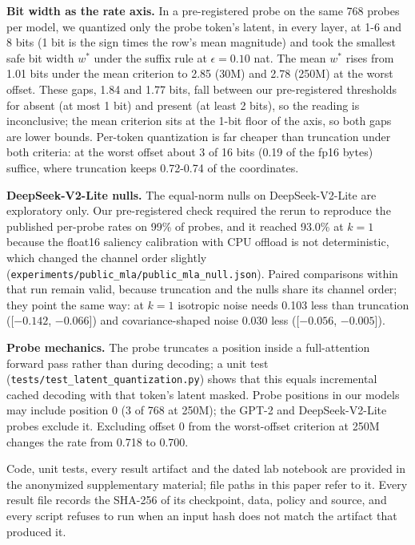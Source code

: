 \documentclass[10pt]{article}
\begin{document}
\textbf{Bit width as the rate axis.} In a pre-registered probe on the same 768 probes per model, we quantized only the probe token's latent, in every layer, at 1-6 and 8 bits (1 bit is the sign times the row's mean magnitude) and took the smallest safe bit width $w^*$ under the suffix rule at $\epsilon=0.10$ nat. The mean $w^*$ rises from 1.01 bits under the mean criterion to 2.85 (30M) and 2.78 (250M) at the worst offset. These gaps, 1.84 and 1.77 bits, fall between our pre-registered thresholds for absent (at most 1 bit) and present (at least 2 bits), so the reading is inconclusive; the mean criterion sits at the 1-bit floor of the axis, so both gaps are lower bounds. Per-token quantization is far cheaper than truncation under both criteria: at the worst offset about 3 of 16 bits (0.19 of the fp16 bytes) suffice, where truncation keeps 0.72-0.74 of the coordinates.

\textbf{DeepSeek-V2-Lite nulls.} The equal-norm nulls on DeepSeek-V2-Lite are exploratory only. Our pre-registered check required the rerun to reproduce the published per-probe rates on 99\% of probes, and it reached 93.0\% at $k=1$ because the float16 saliency calibration with CPU offload is not deterministic, which changed the channel order slightly (\texttt{experiments/\allowbreak public\_mla/\allowbreak public\_mla\_null.json}). Paired comparisons within that run remain valid, because truncation and the nulls share its channel order; they point the same way: at $k=1$ isotropic noise needs 0.103 less than truncation ([$-0.142$, $-0.066$]) and covariance-shaped noise 0.030 less ([$-0.056$, $-0.005$]).

\textbf{Probe mechanics.} The probe truncates a position inside a full-attention forward pass rather than during decoding; a unit test (\texttt{tests/\allowbreak test\_latent\_quantization.py}) shows that this equals incremental cached decoding with that token's latent masked. Probe positions in our models may include position 0 (3 of 768 at 250M); the GPT-2 and DeepSeek-V2-Lite probes exclude it. Excluding offset 0 from the worst-offset criterion at 250M changes the rate from 0.718 to 0.700.

Code, unit tests, every result artifact and the dated lab notebook are provided in the anonymized supplementary material; file paths in this paper refer to it. Every result file records the SHA-256 of its checkpoint, data, policy and source, and every script refuses to run when an input hash does not match the artifact that produced it.
\end{document}
